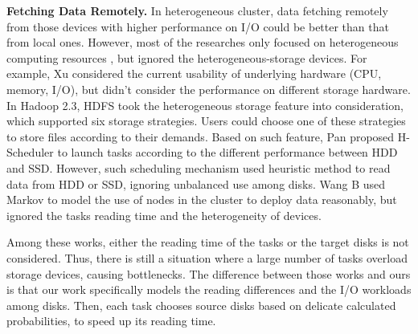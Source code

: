 \documentclass[conference]{IEEEtran}
\begin{document}
\textbf{Fetching Data Remotely.} 
In heterogeneous cluster, data fetching remotely from those devices with higher performance on I/O could be better than that from local ones.
However, most of the researches only focused on heterogeneous computing resources \cite{b25} \cite{b26} \cite{b35} \cite{b36} \cite{b6}, but ignored the heterogeneous-storage devices. For example, Xu \cite{b6} considered the current usability of underlying hardware (CPU, memory, I/O), but didn't consider the performance on different storage hardware. 
In Hadoop 2.3, HDFS\cite{b19} took the heterogeneous storage feature into consideration, which supported six storage strategies. Users could choose one of these strategies to store files according to their demands.
Based on such feature, Pan \cite{b7} proposed H-Scheduler to launch tasks according to the different performance between HDD and SSD. However, such scheduling mechanism used heuristic method to read data from HDD or SSD, ignoring unbalanced use among disks.
Wang B \cite{b8} used Markov to model the use of nodes in the cluster to deploy data reasonably, but ignored the tasks reading time and the heterogeneity of devices. %

Among these works, either the reading time of the tasks or the target disks is not considered. Thus, there is still a situation where a large number of tasks overload storage devices, causing bottlenecks.
The difference between those works and ours is that our work specifically models the reading differences and the I/O workloads among disks. Then, each task chooses source disks based on delicate calculated probabilities, to speed up its reading time.
\end{document}
